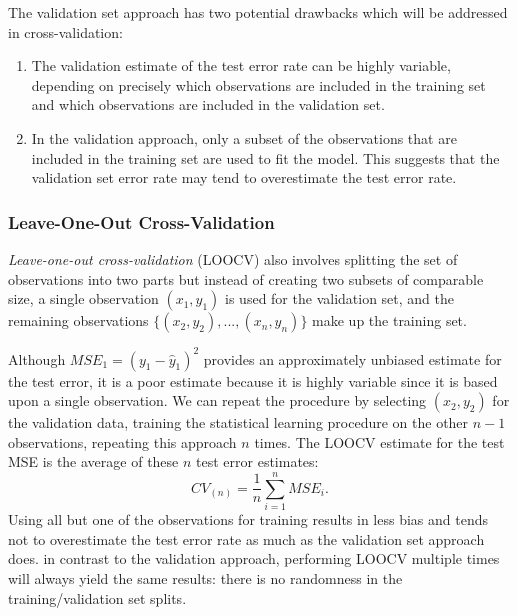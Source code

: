 \documentclass{article}
\numberwithin{equation}{section}
\begin{document}
\begin{enumerate}
The validation set approach has two potential drawbacks which will be addressed in cross-validation:
\begin{enumerate}
    \item The validation estimate of the test error rate can be highly variable, depending on precisely which observations are included in the training set and which observations are included in the validation set.
    \item In the validation approach, only a subset of the observations that are included in the training set are used to fit the model. This suggests that the validation set error rate may tend to overestimate the test error rate.
\end{enumerate}

\subsubsection{Leave-One-Out Cross-Validation}
\textit{Leave-one-out cross-validation} (LOOCV) also involves splitting the set of observations into two parts but instead of creating two subsets of comparable size, a single observation $(x_1, y_1)$ is used for the validation set, and the remaining observations $\{(x_2, y_2),...,(x_n, y_n)\}$ make up the training set. 

Although $MSE_1 = (y_1 - \hat y_1)^2$ provides an approximately unbiased estimate for the test error, it is a poor estimate because it is highly variable since it is based upon a single observation. We can repeat the procedure by selecting $(x_2, y_2)$  for the validation data, training the statistical learning procedure on the other $n - 1$ observations, repeating this approach $n$ times. The LOOCV estimate for the test MSE is the average of these $n$ test error
estimates:
\begin{equation}
     CV_{(n)} = \frac{1}{n} \sum_{i=1}^n MSE_i.
\end{equation}
Using all but one of the observations for training results in less bias and tends not to overestimate the test error rate as much as the validation set approach does. in contrast to the validation approach, performing LOOCV multiple times will always yield the same results: there is no randomness in the training/validation set splits.


\end{enumerate}
\end{document}
